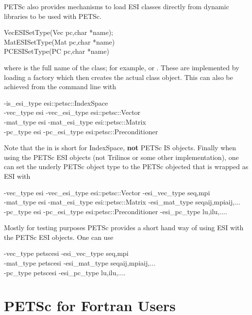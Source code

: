 PETSc also provides mechanisms to load ESI classes directly from dynamic libraries to be
used with PETSc.
\begin{tabbing}
VecESISetType(Vec pc,char *name);\\
MatESISetType(Mat pc,char *name)\\
PCESISetType(PC pc,char *name)
\end{tabbing}
where  is the full name of the class; for example, 
or . These are implemented by loading a factory which then creates the
actual class object. This can also be achieved from the command line with 
\begin{tabbing}
-is\_esi\_type  esi::petsc::IndexSpace\\
-vec\_type esi -vec\_esi\_type esi::petsc::Vector\\
-mat\_type esi -mat\_esi\_type esi::petsc::Matrix\\
-pc\_type esi -pc\_esi\_type esi:petsc::Preconditioner
\end{tabbing}
Note that the  in  is short for IndexSpace, {\bf not} PETSc IS objects.
Finally when using the PETSc ESI objects (not Trilinos or some other implementation), one
can set the underly PETSc object type to the PETSc objected that is wrapped as ESI with
\begin{tabbing}
-vec\_type esi -vec\_esi\_type esi::petsc::Vector  -esi\_vec\_type \trl{<}seq,mpi\trl{>}\\
-mat\_type esi -mat\_esi\_type esi::petsc::Matrix -esi\_mat\_type \trl{<}seqaij,mpiaij,...\trl{>}\\
-pc\_type esi -pc\_esi\_type esi:petsc::Preconditioner -esi\_pc\_type \trl{<}lu,ilu,....\trl{>}
\end{tabbing}
Mostly for testing purposes PETSc provides a short hand way of using ESI with the PETSc ESI objects.
One can use 
\begin{tabbing}
-vec\_type petscesi  -esi\_vec\_type \trl{<}seq,mpi\trl{>}\\
-mat\_type petscesi -esi\_mat\_type \trl{<}seqaij,mpiaij,...\trl{>}\\
-pc\_type petscesi -esi\_pc\_type \trl{<}lu,ilu,....\trl{>}
\end{tabbing}



\chapter{PETSc for Fortran Users}
\label{ch_fortran}

